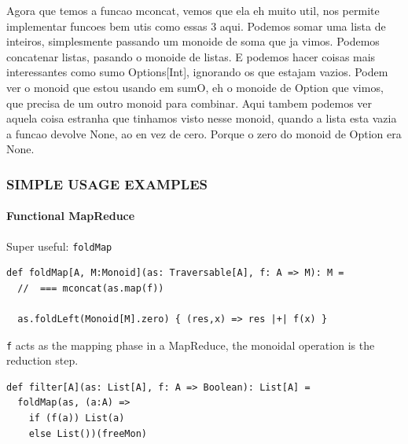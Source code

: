 \documentclass{beamer}
\begin{document}
\begin{frame}[fragile]
{    Agora que temos a funcao mconcat, vemos que ela eh muito util, nos permite
    implementar funcoes bem utis como essas 3 aqui. Podemos somar uma lista de
    inteiros, simplesmente passando um monoide de soma que ja vimos. Podemos
    concatenar listas, pasando o monoide de listas. E podemos hacer coisas mais
    interessantes como sumo Options[Int], ignorando os que estajam vazios.
    Podem ver o monoid que estou usando em sumO, eh o monoide de Option
    que vimos, que precisa de um outro monoid para combinar. Aqui tambem podemos
    ver aquela coisa estranha que tinhamos visto nesse monoid, quando a lista
    esta vazia a funcao devolve None, ao en vez de cero. Porque o zero do monoid
    de Option era None.
  }

\end{frame}

\begin{frame}[fragile] \frametitle{SIMPLE USAGE EXAMPLES}
  \framesubtitle{Functional MapReduce}
  \begin{block}{Super useful: \texttt{foldMap}}
  \begin{lstlisting}
def foldMap[A, M:Monoid](as: Traversable[A], f: A => M): M =
  //  === mconcat(as.map(f))

  as.foldLeft(Monoid[M].zero) { (res,x) => res |+| f(x) }
  \end{lstlisting}
  \end{block}

  \texttt{f} acts as the mapping phase in a MapReduce, the monoidal
  operation is the reduction step.

  \begin{block}{}
  \begin{lstlisting}
def filter[A](as: List[A], f: A => Boolean): List[A] =
  foldMap(as, (a:A) =>
    if (f(a)) List(a)
    else List())(freeMon)
  \end{lstlisting}
  \end{block}

\end{frame}
\end{document}
